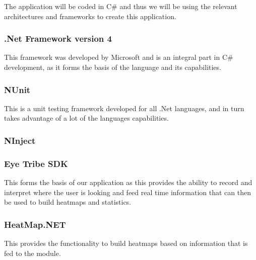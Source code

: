 The application will be coded in C\# and thus we will be using the relevant architectures and frameworks to create this application.

\subsubsection{.Net Framework version 4}
\begin{flushleft}
	This framework was developed by Microsoft and is an integral part in C\# development, as it forms the basis of the language and its capabilities.
\end{flushleft}

\subsubsection{NUnit}
\begin{flushleft}
This is a unit testing framework developed for all .Net languages, and in turn takes advantage of a lot of the languages capabilities.
\end{flushleft}

\subsubsection{NInject}
\begin{flushleft}
\end{flushleft}

\subsubsection{Eye Tribe SDK}
\begin{flushleft}
This forms the basis of our application as this provides the ability to record and interpret where the user is looking and feed real time information that can then be used to build heatmaps and statistics.
\end{flushleft}

\subsubsection{HeatMap.NET}
\begin{flushleft}
This provides the functionality to build heatmaps based on information that is fed to the module.
\end{flushleft}